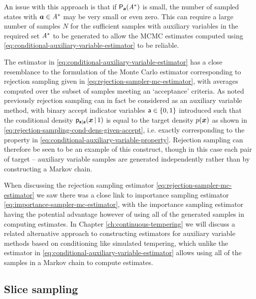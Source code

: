An issue with this approach is that if $\mathsf{P}_{\boldsymbol{\mathsf{a}}}(\mathit{A}^*)$ is small, the number of sampled states with $\boldsymbol{a} \in \mathit{A}^*$ may be very small or even zero. This can require a large number of samples $N$ for the sufficient samples with auxiliary variables in the required set $\mathit{A}^*$ to be generated to allow the \ac{MCMC} estimates computed using \eqref{eq:conditional-auxiliary-variable-estimator} to be reliable. 

The estimator in \eqref{eq:conditional-auxiliary-variable-estimator} has a close resemblance to the formulation of the Monte Carlo estimator corresponding to rejection sampling given in \eqref{eq:rejection-sampler-mc-estimator}, with averages computed over the subset of samples meeting an `acceptance' criteria. As noted previously rejection sampling can in fact be considered as an auxiliary variable method, with binary accept indicator variables $\rvar{a} \in \fset{0,1}$ introduced such that the conditional density $\mathsf{p}_{\boldsymbol{\mathsf{x}}|\mathsf{a}}(\boldsymbol{x}\operatorname{|} 1)$ is equal to the target density $p(\boldsymbol{x})$ as shown in \eqref{eq:rejection-sampling-cond-dens-given-accept}, i.e. exactly corresponding to the property in \eqref{eq:conditional-auxiliary-variable-property}. Rejection sampling can therefore be seen to be an example of this construct, though in this case each pair of target -- auxiliary variable samples are generated independently rather than by constructing a Markov chain.

When discussing the rejection sampling estimator \eqref{eq:rejection-sampler-mc-estimator} we saw there was a close link to importance sampling estimator \eqref{eq:importance-sampler-mc-estimator}, with the importance sampling estimator having the potential advantage however of using all of the generated samples in computing estimates. In Chapter \ref{ch:continuous-tempering} we will discuss a related alternative approach to constructing estimators for auxiliary variable methods based on conditioning like simulated tempering, which unlike the estimator in \eqref{eq:conditional-auxiliary-variable-estimator} allows using all of the samples in a Markov chain to compute estimates.

\subsection{Slice sampling}\label{subsec:slice-sampling}

